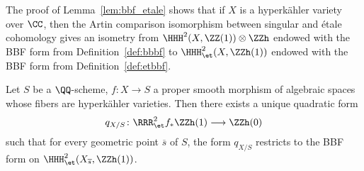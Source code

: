 \begin{remark}
The proof of Lemma~\ref{lem:bbf_etale} shows that if $X$ is a hyperk\"ahler variety over $\CC$, then the Artin comparison isomorphism between singular and \'etale cohomology gives an isometry from $\HHH^2(X,\ZZ(1)) \otimes \ZZh$ endowed with the BBF form from Definition~\ref{def:bbbf} to $\HHH^2_{\et}(X,\ZZh(1))$ endowed with the BBF form from Definition~\ref{def:etbbf}.
\end{remark}


\begin{theorem}\label{thm:mon_et_bbf}
Let $S$ be a $\QQ$-scheme, $f\colon X \rightarrow S$ a proper smooth morphism of algebraic spaces whose fibers are hyperk\"ahler varieties. Then there exists a unique quadratic form
$$
q_{X/S}\colon \RRR_{\et}^2 f_* \ZZh(1) \longrightarrow \ZZh(0)
$$
such that for every geometric point $\overline{s}$ of $S$, the form $q_{X/S}$ restricts to the BBF form on $\HHH^2_{\et}(X_{\overline{s}},\ZZh(1))$.
\end{theorem}
